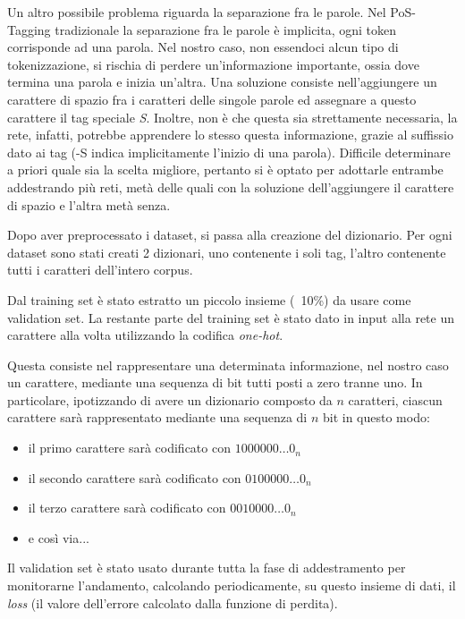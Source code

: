 Un altro possibile problema riguarda la separazione fra le parole.
Nel PoS-Tagging tradizionale la separazione fra le parole \`e implicita, ogni token corrisponde ad una parola.
Nel nostro caso, non essendoci alcun tipo di tokenizzazione, si rischia di perdere un'informazione importante, ossia dove termina una parola e inizia un'altra.
Una soluzione consiste nell'aggiungere un carattere di spazio fra i caratteri delle singole parole ed assegnare a questo carattere il tag speciale \emph{S}.
Inoltre, non \`e che questa sia strettamente necessaria, la rete, infatti, potrebbe apprendere lo stesso questa informazione, grazie al suffissio dato ai tag (-S indica implicitamente l'inizio di una parola).
Difficile determinare a priori quale sia la scelta migliore, pertanto si \`e optato per adottarle entrambe addestrando pi\`u reti, met\`a delle quali con la soluzione dell'aggiungere il carattere di spazio e l'altra met\`a senza.

Dopo aver preprocessato i dataset, si passa alla creazione del dizionario.
Per ogni dataset sono stati creati 2 dizionari, uno contenente i soli tag, l'altro contenente tutti i caratteri dell'intero corpus.

Dal training set \`e stato estratto un piccolo insieme (~10\%) da usare come validation set.
La restante parte del training set \`e stato dato in input alla rete un carattere alla volta utilizzando la codifica \emph{one-hot}.

Questa consiste nel rappresentare una determinata informazione, nel nostro caso un carattere, mediante una sequenza di bit tutti posti a zero tranne uno.
In particolare, ipotizzando di avere un dizionario composto da $n$ caratteri, ciascun carattere sar\`a rappresentato mediante una sequenza di $n$ bit in questo modo:

\begin{itemize}
  \item il primo carattere sar\`a codificato con $1000000\dots0_{n}$
  \item il secondo carattere sar\`a codificato con $0100000\dots0_{n}$
  \item il terzo carattere sar\`a codificato con $0010000\dots0_{n}$
  \item e cos\`i via...
\end{itemize}

Il validation set \`e stato usato durante tutta la fase di addestramento per monitorarne l'andamento, calcolando periodicamente, su questo insieme di dati, il \emph{loss} (il valore dell'errore calcolato dalla funzione di perdita).


